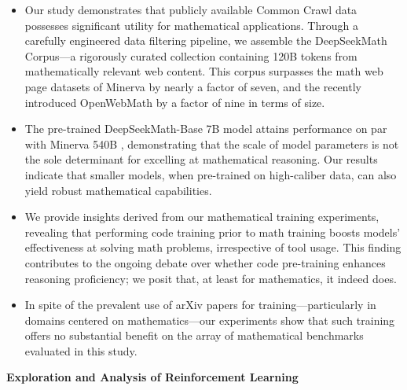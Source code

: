 \begin{itemize}[topsep=0pt]
    \item Our study demonstrates that publicly available Common Crawl data possesses significant utility for mathematical applications. Through a carefully engineered data filtering pipeline, we assemble the DeepSeekMath Corpus—a rigorously curated collection containing 120B tokens from mathematically relevant web content. This corpus surpasses the math web page datasets of Minerva \citep{minerva} by nearly a factor of seven, and the recently introduced OpenWebMath \citep{openwebmath} by a factor of nine in terms of size.

    \item The pre-trained DeepSeekMath-Base 7B model attains performance on par with Minerva 540B \citep{minerva}, demonstrating that the scale of model parameters is not the sole determinant for excelling at mathematical reasoning. Our results indicate that smaller models, when pre-trained on high-caliber data, can also yield robust mathematical capabilities.

    \item We provide insights derived from our mathematical training experiments, revealing that performing code training prior to math training boosts models’ effectiveness at solving math problems, irrespective of tool usage. This finding contributes to the ongoing debate over whether code pre-training enhances reasoning proficiency; we posit that, at least for mathematics, it indeed does.

    \item In spite of the prevalent use of arXiv papers for training—particularly in domains centered on mathematics—our experiments show that such training offers no substantial benefit on the array of mathematical benchmarks evaluated in this study.
\end{itemize}

\textbf{Exploration and Analysis of Reinforcement Learning}

